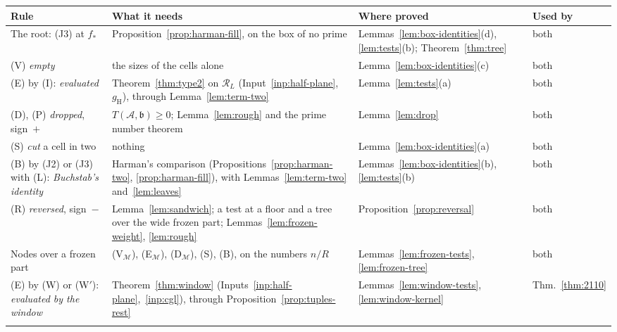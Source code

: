 \documentclass[11pt]{article}
\theoremstyle{definition}
\begin{document}
\begin{table}[t]
\footnotesize
\setlength{\tabcolsep}{4pt}
\begin{tabular}{@{}>{\raggedright\arraybackslash}p{}
  >{\raggedright\arraybackslash}p{}
  >{\raggedright\arraybackslash}p{}
  >{\raggedright\arraybackslash}p{}@{}}
\toprule
Rule & What it needs & Where proved & Used by \\
\midrule
The root: (J3) at $f_*$ & Proposition~\ref{prop:harman-fill}, on the box of no prime &
  Lemmas~\ref{lem:box-identities}(d), \ref{lem:tests}(b); Theorem~\ref{thm:tree} & both \\
\addlinespace[1pt]
(V) \emph{empty} & the sizes of the cells alone & Lemma~\ref{lem:box-identities}(c) & both \\
\addlinespace[1pt]
(E) by (I): \emph{evaluated} & Theorem~\ref{thm:type2} on $\mathcal R_L$ (Input~\ref{inp:half-plane}, $g_{\mathrm H}$),
  through Lemma~\ref{lem:term-two} & Lemma~\ref{lem:tests}(a) & both \\
\addlinespace[1pt]
(D), (P) \emph{dropped}, sign~$+$ & $T(\mathcal A, \mathfrak b) \ge 0$; Lemma~\ref{lem:rough} and the prime number
  theorem & Lemma~\ref{lem:drop} & both \\
\addlinespace[1pt]
(S) \emph{cut} a cell in two & nothing & Lemma~\ref{lem:box-identities}(a) & both \\
\addlinespace[1pt]
(B) by (J2) or (J3) with (L): \emph{Buchstab's identity} & Harman's comparison (Propositions~\ref{prop:harman-two},
  \ref{prop:harman-fill}), with Lemmas~\ref{lem:term-two} and~\ref{lem:leaves} & Lemmas~\ref{lem:box-identities}(b),
  \ref{lem:tests}(b) & both \\
\addlinespace[1pt]
(R) \emph{reversed}, sign~$-$ & Lemma~\ref{lem:sandwich}; a test at a floor and a tree over the wide frozen part;
  Lemmas~\ref{lem:frozen-weight}, \ref{lem:rough} & Proposition~\ref{prop:reversal} & both \\
\addlinespace[1pt]
Nodes over a frozen part & (V$_{\mathcal M}$), (E$_{\mathcal M}$), (D$_{\mathcal M}$), (S), (B), on the numbers $n/R$
  & Lemmas~\ref{lem:frozen-tests}, \ref{lem:frozen-tree} & both \\
\midrule
(E) by (W) or (W$'$): \emph{evaluated by the window} & Theorem~\ref{thm:window}
(Inputs~\ref{inp:half-plane},~\ref{inp:cgl}),
  through Proposition~\ref{prop:tuples-rest} & Lemmas~\ref{lem:window-tests},
  \ref{lem:window-kernel} & Thm.~\ref{thm:2110} \\
\addlinespace[1pt]

\end{tabular}
\end{table}
\end{document}
